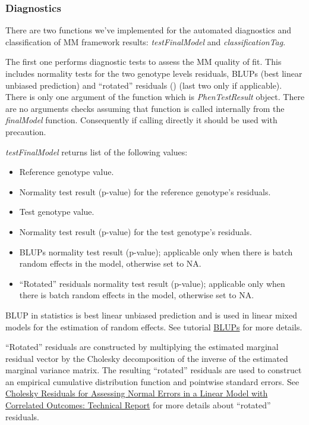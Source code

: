 \documentclass[12pt,a4paper]{article}
\begin{document}
\subsubsection{Diagnostics}
\label{MMDiagnostics}
There are two functions we've implemented for the automated diagnostics and classification of MM framework results: \textit{testFinalModel} and \textit{classificationTag}.
 
The first one performs diagnostic tests to assess the MM quality of fit. This includes normality tests for the two genotype levels residuals, BLUPs (best linear unbiased prediction) and 
``rotated'' residuals (\cite{RotatedResiduals04}) (last two only if applicable). There is only one argument of the function which is \textit{PhenTestResult} object. There are no arguments checks assuming that 
function is called internally from the \textit{finalModel} function. Consequently if calling directly it should be used with precaution. 

 \textit{testFinalModel} returns list of the following values:
 \begin{itemize}
  \item Reference genotype value.
  \item Normality test result (p-value) for the reference genotype's residuals.
  \item Test genotype value.
  \item Normality test result (p-value) for the test genotype's residuals.
  \item BLUPs normality test result (p-value); applicable only when there is batch random effects in the model, otherwise set to NA.
  \item ``Rotated'' residuals normality test result (p-value); applicable only when there is batch random effects in the model, otherwise set to NA.
 \end{itemize}

BLUP in statistics is best linear unbiased prediction and is used in linear mixed models for the estimation of random effects. 
See tutorial \href{http://www.extension.org/pages/61006/the-solcap-tomato-phenotypic-data:-estimating-heritability-and-blups-for-traits#.Ui4zjWRgYXc}{BLUPs} for more details.

``Rotated'' residuals are constructed by multiplying the estimated marginal residual vector by
the Cholesky decomposition of the inverse of the estimated marginal variance
matrix. The resulting ``rotated'' residuals are used to construct an empirical cumulative distribution function and pointwise standard errors. See
\href{http://biostats.bepress.com/cgi/viewcontent.cgi?article=1019&context=harvardbiostat}{Cholesky Residuals for Assessing Normal
Errors in a Linear Model with Correlated
Outcomes: Technical Report} for more details about ``rotated'' residuals.
\end{document}
